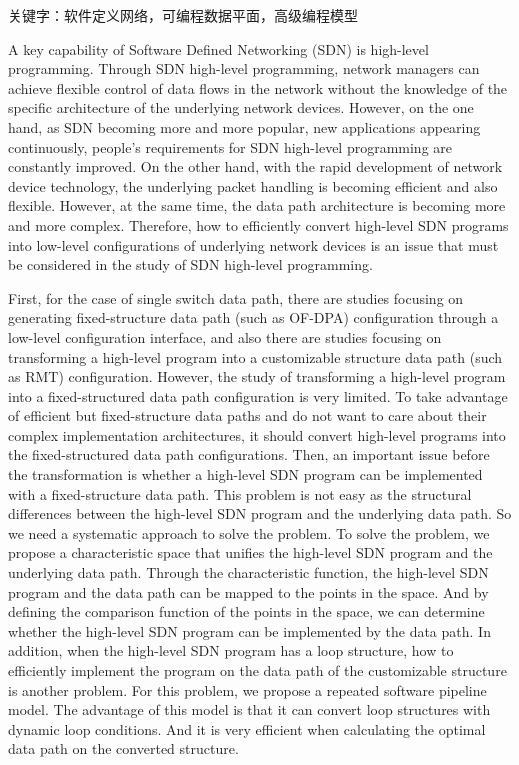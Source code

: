 \documentclass{ctexart}
\begin{document}
关键字：软件定义网络，可编程数据平面，高级编程模型


A key capability of Software Defined Networking (SDN) is high-level programming. Through SDN high-level programming, network managers can achieve flexible control of data flows in the network without the knowledge of the specific architecture of the underlying network devices. However, on the one hand, as SDN becoming more and more popular, new applications appearing continuously, people's requirements for SDN high-level programming ​​are constantly improved. On the other hand, with the rapid development of network device technology, the underlying packet handling is becoming efficient and also flexible. However, at the same time, the data path architecture is becoming more and more complex. Therefore, how to efficiently convert high-level SDN programs into low-level configurations of underlying network devices is an issue that must be considered in the study of SDN high-level programming.



First, for the case of single switch data path, there are studies focusing on generating fixed-structure data path (such as OF-DPA) configuration through a low-level configuration interface, and also there are studies focusing on transforming a high-level program into a customizable structure data path (such as RMT) configuration. However, the study of transforming a high-level program into a fixed-structured data path configuration is very limited. To take advantage of efficient but fixed-structure data paths and do not want to care about their complex implementation architectures, it should convert high-level programs into the fixed-structured data path configurations. Then, an important issue before the transformation is whether a high-level SDN program can be implemented with a fixed-structure data path. This problem is not easy as the structural differences between the high-level SDN program and the underlying data path. So we need a systematic approach to solve the problem. To solve the problem, we propose a characteristic space that unifies the high-level SDN program and the underlying data path. Through the characteristic function, the high-level SDN program and the data path can be mapped to the points in the space. And by defining the comparison function of the points in the space, we can determine whether the high-level SDN program can be implemented by the data path. In addition, when the high-level SDN program has a loop structure, how to efficiently implement the program on the data path of the customizable structure is another problem. For this problem, we propose a repeated software pipeline model. The advantage of this model is that it can convert loop structures with dynamic loop conditions. And it is very efficient when calculating the optimal data path on the converted structure.
\end{document}
